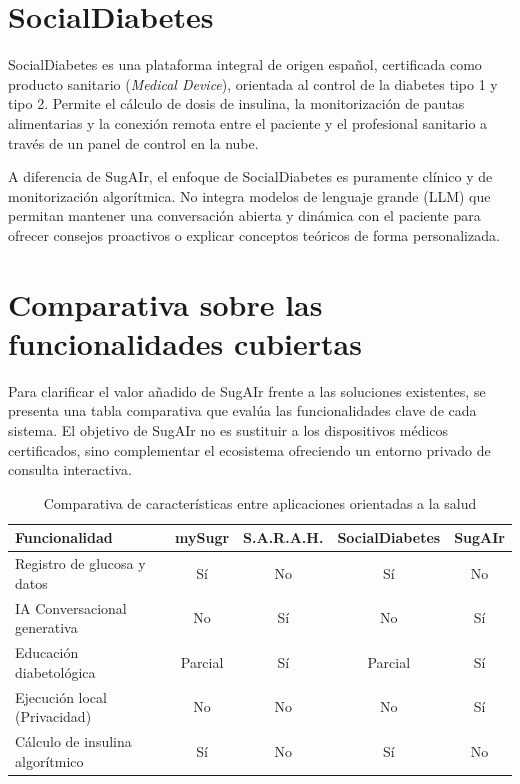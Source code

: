 \section{SocialDiabetes}
SocialDiabetes \cite{socialdiabetes} es una plataforma integral de origen español, certificada como producto sanitario (\textit{Medical Device}), orientada al control de la diabetes tipo 1 y tipo 2. Permite el cálculo de dosis de insulina, la monitorización de pautas alimentarias y la conexión remota entre el paciente y el profesional sanitario a través de un panel de control en la nube.

A diferencia de SugAIr, el enfoque de SocialDiabetes es puramente clínico y de monitorización algorítmica. No integra modelos de lenguaje grande (LLM) que permitan mantener una conversación abierta y dinámica con el paciente para ofrecer consejos proactivos o explicar conceptos teóricos de forma personalizada.

\section{Comparativa sobre las funcionalidades cubiertas}

Para clarificar el valor añadido de SugAIr frente a las soluciones existentes, se presenta una tabla comparativa que evalúa las funcionalidades clave de cada sistema. El objetivo de SugAIr no es sustituir a los dispositivos médicos certificados, sino complementar el ecosistema ofreciendo un entorno privado de consulta interactiva.

\begin{table}[htbp]
\centering
\caption{Comparativa de características entre aplicaciones orientadas a la salud}
\vspace{0.2cm}
\begin{tabular}{|l|c|c|c|c|}
\hline
\textbf{Funcionalidad} & \textbf{mySugr} & \textbf{S.A.R.A.H.} & \textbf{SocialDiabetes} & \textbf{SugAIr} \\ \hline
Registro de glucosa y datos & Sí & No & Sí & No \\ \hline
IA Conversacional generativa & No & Sí & No & Sí \\ \hline
Educación diabetológica & Parcial & Sí & Parcial & Sí \\ \hline
Ejecución local (Privacidad) & No & No & No & Sí \\ \hline
Cálculo de insulina algorítmico& Sí & No & Sí & No \\ \hline
\end{tabular}
\label{tab:comparativa_apps}
\end{table}

